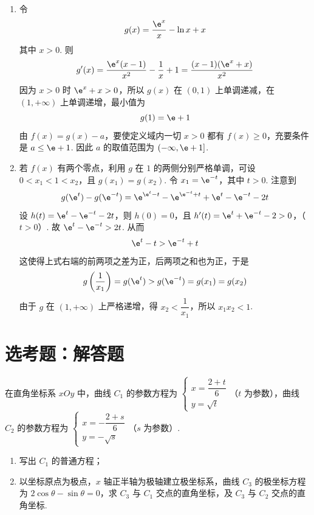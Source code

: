 \begin{solution}
\begin{enumerate}
\item 令
\[
g(x)=\frac{\e^x}{x}-\ln x+x
\]
其中 \(x>0\). 则
\[
g'(x)=\frac{\e^x(x-1)}{x^2}-\frac1x+1=\frac{(x-1)(\e^x+x)}{x^2}
\]
因为 \(x>0\) 时 \(\e^x+x>0\)，所以 \(g(x)\) 在 \((0,1)\) 上单调递减，在 \((1,+\infty)\) 上单调递增，最小值为
\[
g(1)=\e+1
\]
由 \(f(x)=g(x)-a\)，要使定义域内一切 \(x>0\) 都有 \(f(x)\ge0\)，充要条件是 \(a\le\e+1\). 因此 \(a\) 的取值范围为 \((-\infty,\e+1]\).
\item 若 \(f(x)\) 有两个零点，利用 \(g\) 在 \(1\) 的两侧分别严格单调，可设 \(0<x_1<1<x_2\)，且 \(g(x_1)=g(x_2)\). 令 \(x_1=\e^{-t}\)，其中 \(t>0\). 注意到
\[
g(\e^t)-g(\e^{-t})=\e^{\e^t-t}-\e^{\e^{-t}+t}+\e^t-\e^{-t}-2t
\]
设 \(h(t)=\e^t-\e^{-t}-2t\)，则 \(h(0)=0\)，且
\(h'(t)=\e^t+\e^{-t}-2>0\)，（\(t>0\)）.
故 \(\e^t-\e^{-t}>2t\). 从而
\[
\e^t-t>\e^{-t}+t
\]
这使得上式右端的前两项之差为正，后两项之和也为正，于是
\[
g\left(\frac1{x_1}\right)=g(\e^t)>g(\e^{-t})=g(x_1)=g(x_2)
\]
由于 \(g\) 在 \((1,+\infty)\) 上严格递增，得 \(x_2<\dfrac1{x_1}\)，所以 \(x_1x_2<1\).
\end{enumerate}
\end{solution}

\section{选考题：解答题}

\begin{problem}
在直角坐标系 \(xOy\) 中，曲线 \(C_1\) 的参数方程为 \(\begin{cases}
x=\dfrac{2+t}{6}\\
y=\sqrt t
\end{cases}\)（\(t\) 为参数），曲线 \(C_2\) 的参数方程为 \(\begin{cases}
x=-\dfrac{2+s}{6}\\
y=-\sqrt s
\end{cases}\)（\(s\) 为参数）.

\begin{enumerate}
\item 写出 \(C_1\) 的普通方程；
\item 以坐标原点为极点，\(x\) 轴正半轴为极轴建立极坐标系，曲线 \(C_3\) 的极坐标方程为 \(2\cos\theta-\sin\theta=0\)，求 \(C_3\) 与 \(C_1\) 交点的直角坐标，及 \(C_3\) 与 \(C_2\) 交点的直角坐标.
\end{enumerate}
\end{problem}

